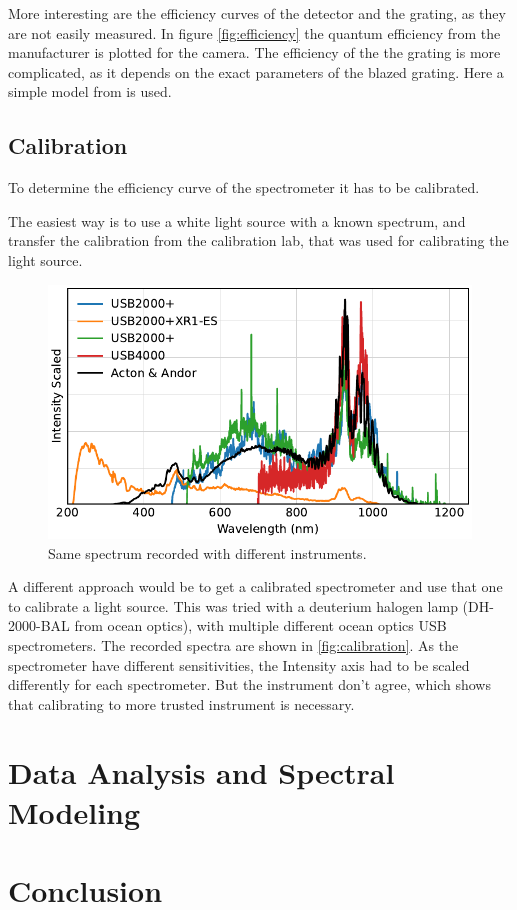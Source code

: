 \documentclass[
	parskip=half,
	a4paper,
]{scrarticle}
\begin{document}
More interesting are the efficiency curves of the detector and the grating, as they are not easily measured. In figure \autoref{fig:efficiency} the quantum efficiency from the manufacturer is plotted for the camera. The efficiency of the the grating is more complicated, as it depends on the exact parameters of the blazed grating. Here a simple model from \cite{barker_ripple_1984} is used.



\subsection{Calibration}
To determine the efficiency curve of the spectrometer it has to be calibrated.

The easiest way is to use a white light source with a known spectrum, and transfer the calibration from the calibration lab, that was used for calibrating the light source.

\begin{figure}[hb]
    \centering
    \includegraphics{../analysis/figures/efficiency_different.pdf}
    \caption{Same spectrum recorded with different instruments.}
    \label{fig:calibration}
\end{figure}
A different approach would be to get a calibrated spectrometer and use that one to calibrate a light source. This was tried with a deuterium halogen lamp (DH-2000-BAL from ocean optics), with multiple different ocean optics USB spectrometers.
The recorded spectra are shown in \autoref{fig:calibration}. 
As the spectrometer have different sensitivities, the Intensity axis had to be scaled differently for each spectrometer. But the instrument don't agree, which shows that calibrating to more trusted instrument is necessary.



\clearpage
\section{Data Analysis and Spectral Modeling}

\clearpage
\section{Conclusion}

\clearpage
\printbibliography
\end{document}
